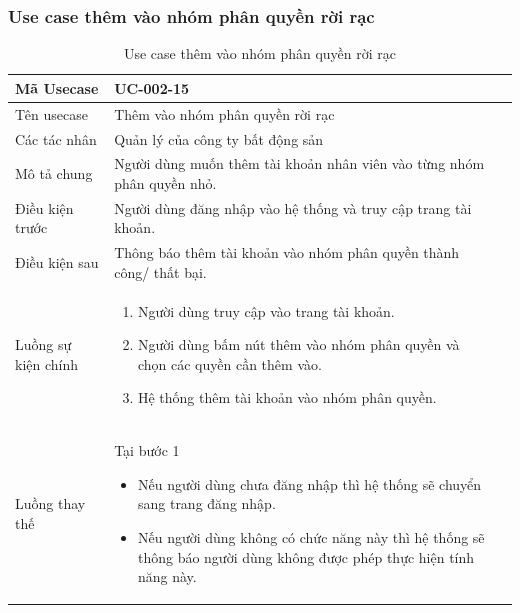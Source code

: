 \documentclass[12pt,a4paper]{article}
\begin{document}

    \subsubsection*{Use case thêm vào nhóm phân quyền rời rạc}
    \begin{table}[H]
        \centering
        \begin{tabular}{|p{3.5cm}|p{11.5cm}|c|}
            \hline
            Mã Usecase      & UC-002-15                                                              \\
            \hline
            Tên usecase     & Thêm vào nhóm phân quyền rời rạc                                       \\
            \hline
            Các tác nhân    & Quản lý của công ty bất động sản                                       \\
            \hline
            Mô tả chung     & Người dùng muốn thêm tài khoản nhân viên vào từng nhóm phân quyền nhỏ. \\
            \hline
            Điều kiện trước & Người dùng đăng nhập vào hệ thống và truy cập trang tài khoản.         \\
            \hline
            Điều kiện sau   & Thông báo thêm tài khoản vào nhóm phân quyền thành công/ thất bại.     \\
            \hline
            Luồng sự kiện chính & \vspace{-.8cm}\begin{enumerate}
                                                    \item Người dùng truy cập vào trang tài khoản.
                                                    \item Người dùng bấm nút thêm vào nhóm phân quyền và chọn các quyền cần thêm vào.
                                                    \item Hệ thống thêm tài khoản vào nhóm phân quyền.
            \end{enumerate}
            \\
            \hline
            Luồng thay thế & Tại bước 1\newline
            \vspace{-.8cm}\begin{itemize}
                              \item Nếu người dùng chưa đăng nhập thì hệ thống sẽ chuyển sang trang đăng nhập.
                              \item Nếu người dùng không có chức năng này thì hệ thống sẽ thông báo người dùng không được phép thực hiện tính năng này.
            \end{itemize}
            \\ \hline
        \end{tabular}
        \caption{Use case thêm vào nhóm phân quyền rời rạc}
    \end{table}
\end{document}
